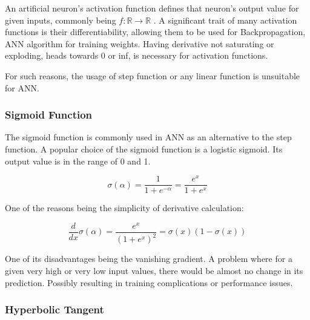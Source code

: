 An artificial neuron's activation function defines that neuron's output value
for given inputs, commonly being ${f: \mathbb{R} \rightarrow \mathbb{R}}$ \cite{leskovec2020mining}. A significant trait of many activation functions is their differentiability, allowing them to be used for Backpropagation, ANN algorithm for training weights. Having derivative not saturating or exploding, heads towards 0 or inf, is necessary for activation functions.

For such reasons, the usage of step function or any linear function is unsuitable for ANN.
\subsubsection{Sigmoid Function}
The sigmoid function is commonly used in ANN as an alternative to the step function. A popular choice of the sigmoid function is a logistic sigmoid. Its output value is in the range of 0 and 1.

\begin{equation}
    {\sigma(\alpha) = \frac{1}{1 + e^{-\alpha}} = \frac{e^x}{1 + e^{x}}}
\end{equation}




One of the reasons being the simplicity of derivative calculation:

\begin{equation}
    {\frac{d}{dx}\sigma(\alpha) = \frac{e^x}{(1 + e^{x})^2} = \sigma(x)(1-\sigma(x))}
\end{equation}


One of its disadvantages being the vanishing gradient. A problem where for a given very high or very low input values, there would be almost no change in its prediction. Possibly resulting in training complications or performance issues.\cite{7typesactivationfunctions}


\subsubsection{Hyperbolic Tangent}


